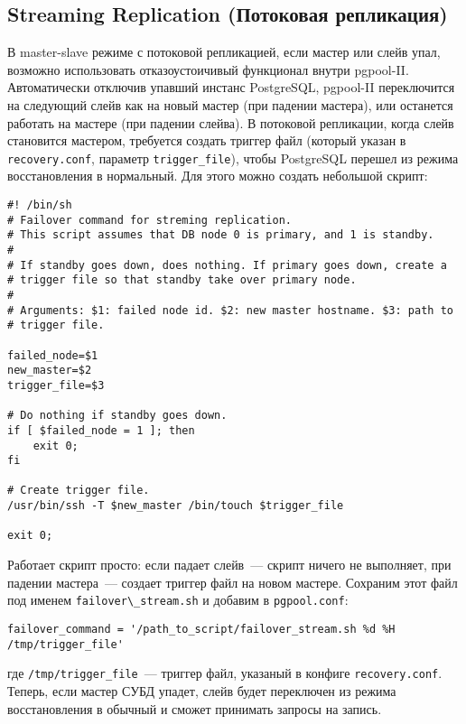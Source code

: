 \subsection{Streaming Replication (Потоковая репликация)}

В master-slave режиме с потоковой репликацией, если мастер или слейв упал, возможно использовать отказоустоичивый функционал внутри pgpool-II. Автоматически отключив упавший инстанс PostgreSQL, pgpool-II переключится на следующий слейв как на новый мастер (при падении мастера), или останется работать на мастере (при падении слейва). В потоковой репликации, когда слейв становится мастером, требуется создать триггер файл (который указан в \lstinline!recovery.conf!, параметр \lstinline!trigger_file!), чтобы PostgreSQL перешел из режима восстановления в нормальный. Для этого можно создать небольшой скрипт:

\begin{lstlisting}[label=lst:pgpool40,caption=Скрипт выполняется при падении нода PostgreSQL]
#! /bin/sh
# Failover command for streming replication.
# This script assumes that DB node 0 is primary, and 1 is standby.
#
# If standby goes down, does nothing. If primary goes down, create a
# trigger file so that standby take over primary node.
#
# Arguments: $1: failed node id. $2: new master hostname. $3: path to
# trigger file.

failed_node=$1
new_master=$2
trigger_file=$3

# Do nothing if standby goes down.
if [ $failed_node = 1 ]; then
	exit 0;
fi

# Create trigger file.
/usr/bin/ssh -T $new_master /bin/touch $trigger_file

exit 0;
\end{lstlisting}

Работает скрипт просто: если падает слейв~--- скрипт ничего не выполняет, при падении мастера~--- создает триггер файл на новом мастере. Сохраним этот файл под именем \lstinline!failover\_stream.sh! и добавим в \lstinline!pgpool.conf!:

\begin{lstlisting}[label=lst:pgpool41,caption=Что выполнять при падении нода]
failover_command = '/path_to_script/failover_stream.sh %d %H /tmp/trigger_file'
\end{lstlisting}

где \lstinline!/tmp/trigger_file!~--- триггер файл, указаный в конфиге \lstinline!recovery.conf!. Теперь, если мастер СУБД упадет, слейв будет переключен из режима восстановления в обычный и сможет принимать запросы на запись.



